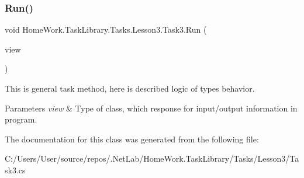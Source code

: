 \subsubsection{\texorpdfstring{Run()}{Run()}}
{\footnotesize\ttfamily void Home\+Work.\+Task\+Library.\+Tasks.\+Lesson3.\+Task3.\+Run (\begin{DoxyParamCaption}\item[{I\+Information}]{view }\end{DoxyParamCaption})}



This is general task method, here is described logic of types behavior. 


\begin{DoxyParams}{Parameters}
{\em view} & Type of class, which response for input/output information in program.\\
\hline
\end{DoxyParams}


The documentation for this class was generated from the following file\+:\begin{DoxyCompactItemize}
\item 
C\+:/\+Users/\+User/source/repos/.\+Net\+Lab/\+Home\+Work.\+Task\+Library/\+Tasks/\+Lesson3/Task3.\+cs\end{DoxyCompactItemize}
